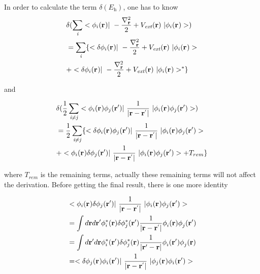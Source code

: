 \documentclass[a4paper, 12pt, titlepage,oneside,drop]{kthesis}
\begin{document}
\noindent In order to calculate the term $\delta ( E_{\textit{h}} ) $, one has to know
\begin{equation}\begin{split}\label{hartree1}
& \delta ( \sumi<i> <\bwf<i><> |\ -\frac{\nabla^{2}_{\textbf r}}{2} + V_\textit{ext}(\textbf{r})  \ | \bwf<i><> > ) \\
&  = \sumi<i> \{ < \delta \bwf<i><> |\ -\frac{\nabla^{2}_{\textbf r}}{2} + V_\textit{ext}(\textbf{r})  \ | \bwf<i><> >  \\
&  + <  \delta \bwf<i><> |\ -\frac{\nabla^{2}_{\textbf r}}{2} + V_\textit{ext}(\textbf{r})  \ |  \bwf<i><> >^{\ast} \}
\end{split}\end{equation}

\noindent and 

\begin{equation}\begin{split}\label{hartree2}
&  \delta( \frac{1}{2} \suminj<i><j> <\bwf<i><> \bwfn<j><'>|\ \frac{1}{|\textbf{r} - \textbf{r}^{'} |} \ | \bwf<i><> \bwfn<j><'>>)   \\
& =   \frac{1}{2} \suminj<i><j> \{  <\delta \bwf<i><> \bwfn<j><'>|\ \frac{1}{|\textbf{r} - \textbf{r}^{'} |} \ | \bwf<i><> \bwfn<j><'>>  \\
& +   < \bwf<i><> \delta \bwfn<j><'>|\ \frac{1}{|\textbf{r} - \textbf{r}^{'} |} \ | \bwf<i><> \bwfn<j><'>> +  T_{rem}\}
\end{split}\end{equation}

\noindent where $T_{rem}$ is the remaining terms, actually these remaining terms will not affect the derivation. Before getting the final result, 
there is one more identity 

\begin{equation}\begin{split}\label{hartreelabel1}
& < \bwf<i><> \delta \bwfn<j><'>|\ \frac{1}{|\textbf{r} - \textbf{r}^{'} |} \ | \bwf<i><> \bwfn<j><'>> \\
& = \int d \textbf{r} d \textbf{r}{'}  \phi_{i}^{*} (\textbf{r}{}) \delta \phi_{j}^{*} (\textbf{r}{'}) \frac{1}{|\textbf{r} - \textbf{r}^{'} |}  \phi_{i}^{} (\textbf{r}{})  \phi_{j}^{} (\textbf{r}{'})\\
& = \int d \textbf{r}{'} d \textbf{r}  \phi_{i}^{*} (\textbf{r}{'}) \delta \phi_{j}^{*} (\textbf{r}{}) \frac{1}{|\textbf{r}{'} - \textbf{r} |}  \phi_{i}^{} (\textbf{r}{'})  \phi_{j}^{} (\textbf{r})\\
& = <\delta \bwf<j><> \bwfn<i><'>|\ \frac{1}{|\textbf{r} - \textbf{r}^{'} |} \ | \bwf<j><> \bwfn<i><'>>
\end{split}\end{equation}
\end{document}
